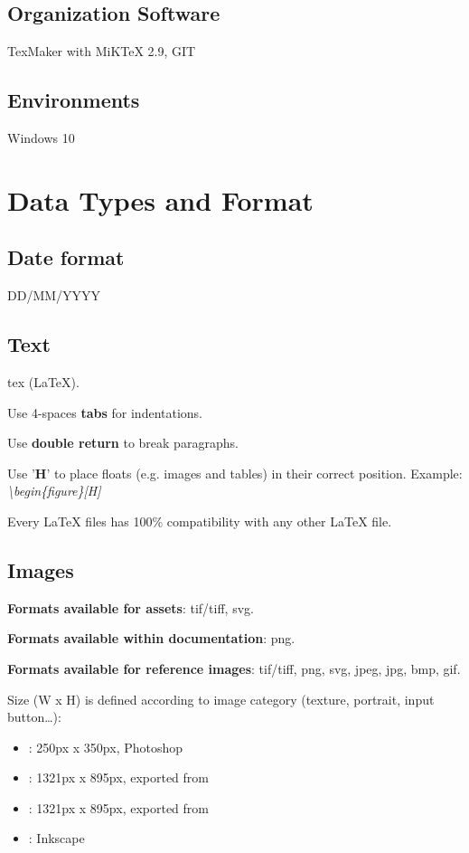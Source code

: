 \documentclass[12pt]{article}
\begin{document}
\subsection{Organization Software}
TexMaker with MiKTeX 2.9, GIT

\subsection{Environments}
Windows 10

\section{Data Types and Format}

\subsection{Date format}
DD/MM/YYYY

\subsection{Text}
tex (LaTeX).

Use 4-spaces \textbf{tabs} for indentations.

Use \textbf{double return} to break paragraphs.

Use '\textbf{H}' to place floats (e.g. images and tables) in their correct position. Example: \textit{\textbackslash{}begin\{figure\}[H]}

Every LaTeX files has 100\% compatibility with any other LaTeX file.

\subsection{Images}
\textbf{Formats available for assets}: tif/tiff, svg.

\textbf{Formats available within documentation}: png.

\textbf{Formats available for reference images}: tif/tiff, png, svg, jpeg, jpg, bmp, gif.

Size (W x H) is defined according to image category (texture, portrait, input button…):
\begin{itemize}
	\item \textbf{}: 250px x 350px, Photoshop
	\item \textbf{}: 1321px x 895px, exported from 
	\item \textbf{}: 1321px x 895px, exported from 
	\item \textbf{}: Inkscape
\end{itemize}
\end{document}
